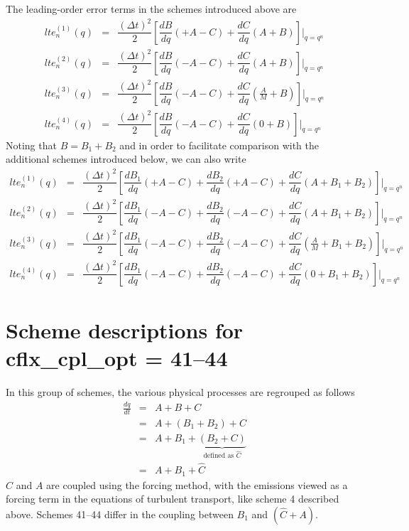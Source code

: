 \documentclass[12pt]{article}
\begin{document}
The leading-order error terms in the schemes introduced above are
\begin{eqnarray}
lte^{(1)}_n(q)
&=& \dfrac{(\Delta t)^2}{2}\left[  \dfrac{dB}{dq}(+A-C) + \dfrac{dC}{dq}(A+B)\right]\bigg|_{q=q^n} \\
lte^{(2)}_n(q)
&=& \dfrac{(\Delta t)^2}{2}\left[  \dfrac{dB}{dq}(-A-C) + \dfrac{dC}{dq}(A+B)\right]\bigg|_{q=q^n} \\
lte^{(3)}_n(q)
&=& \dfrac{(\Delta t)^2}{2}\left[  \dfrac{dB}{dq}(-A-C) + \dfrac{dC}{dq}\left(\frac{A}{M}+B\right)\right]\bigg|_{q=q^n}\\
lte^{(4)}_n(q)
&=& \dfrac{(\Delta t)^2}{2}\left[  \dfrac{dB}{dq}(-A-C) + \dfrac{dC}{dq}(0+B)\right]\bigg|_{q=q^n}
\end{eqnarray}
%
%
Noting that $B= B_1+B_2$ and in order to facilitate comparison with the additional schemes introduced below,
we can also write
\begin{eqnarray}
lte^{(1)}_n(q)
&=& \dfrac{(\Delta t)^2}{2}\left[  \dfrac{dB_1}{dq}(+A-C) + \dfrac{dB_2}{dq}(+A-C)+ \dfrac{dC}{dq}(A+B_1+B_2)\right]\bigg|_{q=q^n} \\
lte^{(2)}_n(q)
&=& \dfrac{(\Delta t)^2}{2}\left[  \dfrac{dB_1}{dq}(-A-C) + \dfrac{dB_2}{dq}(-A-C)+ \dfrac{dC}{dq}(A+B_1+B_2)\right]\bigg|_{q=q^n} \\
lte^{(3)}_n(q)
&=& \dfrac{(\Delta t)^2}{2}\left[  \dfrac{dB_1}{dq}(-A-C) + \dfrac{dB_2}{dq}(-A-C)+ \dfrac{dC}{dq}\left(\frac{A}{M}+B_1+B_2\right)\right]\bigg|_{q=q^n}\\
lte^{(4)}_n(q)
&=& \dfrac{(\Delta t)^2}{2}\left[  \dfrac{dB_1}{dq}(-A-C) + \dfrac{dB_2}{dq}(-A-C)+ \dfrac{dC}{dq}(0+B_1+B_2)\right]\bigg|_{q=q^n}
\end{eqnarray}





\section{Scheme descriptions for \sf cflx\_cpl\_opt = 41--44}

In this group of schemes, the various physical processes are regrouped as follows   
\begin{eqnarray}
    \frac{dq}{dt} &=& A + B + C \\
    &=& A + (B_1 + B_2) + C \\
    &=& A + B_1 + \underbrace{(B_2 + C)}_{{\text{defined as }\hat{C}}} \\
    &=& A + B_1 + \hat{C} 
\end{eqnarray}
%
$\hat{C}$ and $A$ are coupled using the forcing method, with the emissions viewed as a forcing term
in the equations of turbulent transport, like scheme 4 described above. 
Schemes 41--44 differ in the coupling between $B_1$ and $\left(\hat{C}+A\right)$.
\end{document}
